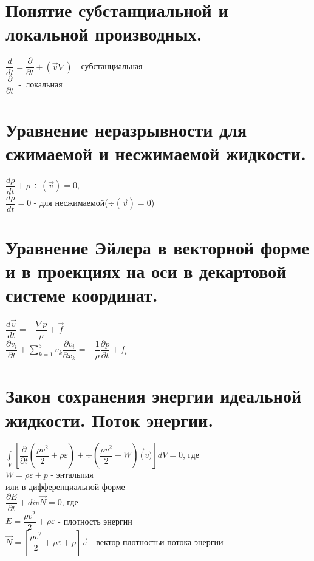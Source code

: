 


\newcommand{\sumk}{\sum\limits_{k=1}^3v_k}


	\small
	\begin{multicols*}{4}
		\section{Понятие субстанциальной и локальной производных.}
		$\dfrac{d}{dt}=\dfrac{\partial}{\partial t}+(\vec{v}\nabla)$ - субстанциальная \\
		$\dfrac{\partial}{\partial t}$~-~локальная
		
		\section{Уравнение неразрывности для сжимаемой и несжимаемой жидкости.}
		$\dfrac{d\rho}{dt}+\rho \div(\vec{v})=0$, \\
		$\dfrac{d\rho}{dt}=0$ -  для несжимаемой($\div(\vec{v})=0$)
		
		\section{Уравнение Эйлера в векторной форме и в проекциях на оси в декартовой системе координат.}
		$\dfrac{d\vec{v}}{dt}=-\dfrac{\nabla p}{\rho}+\vec{f}$ \\
		$\dfrac{\partial v_i}{\partial t}+\sumk\dfrac{\partial v_i}{\partial x_k}=-\dfrac{1}{\rho}\dfrac{\partial p}{\partial t}+f_i$
		
		\section{Закон сохранения энергии идеальной жидкости. Поток энергии.}
		$\int\limits_V\left[\dfrac{\partial}{\partial t}(\dfrac{\rho v^2}{2}+\rho\varepsilon)+\div(\dfrac{\rho v^2}{2}+W)\vec(v)\right]dV=0$, где\\
		$W=\rho\varepsilon+p$ - энтальпия \\
		или в дифференциальной форме \\
		$\dfrac{\partial E}{\partial t}+div\vec{N}=0$, где \\
		$E=\dfrac{\rho v^2}{2}+\rho\varepsilon$ - плотность энергии \\
		$\vec{N}=\left[\dfrac{\rho v^2}{2}+\rho\varepsilon+p\right]\vec{v}$ - вектор плотностьи потока энергии
		

\end{multicols*}
